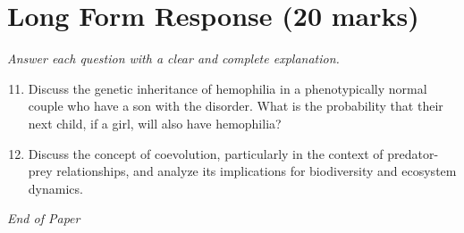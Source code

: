 \documentclass[12pt]{article}
\begin{document}
\section*{Long Form Response (20 marks)}
\textit{Answer each question with a clear and complete explanation.}
\begin{enumerate}[label=\arabic*.]
\setcounter{enumi}{10}
\item Discuss the genetic inheritance of hemophilia in a phenotypically normal couple who have a son with the disorder. What is the probability that their next child, if a girl, will also have hemophilia?
\item Discuss the concept of coevolution, particularly in the context of predator-prey relationships, and analyze its implications for biodiversity and ecosystem dynamics.
\end{enumerate}

\vfill
\noindent\textit{End of Paper}
\end{document}
